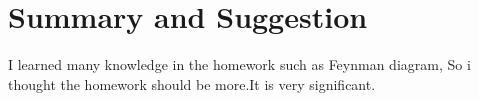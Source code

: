 \documentclass[
10pt, %
a4paper, %
oneside, %
headinclude,footinclude, %
BCOR5mm, %
]{scrartcl}
\begin{document}

\section{Summary and Suggestion}






I learned many knowledge in the homework such as Feynman diagram, So i thought the homework should be more.It is very significant.


\renewcommand{\refname}{\spacedlowsmallcaps{References}} %














\end{document}
